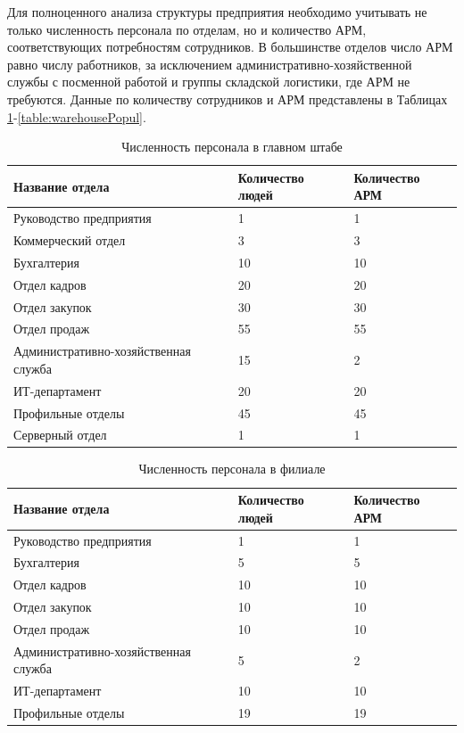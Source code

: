 \documentclass[14pt, a4paper]{extarticle}
\numberwithin{equation}{section}
\begin{document}
Для полноценного анализа структуры предприятия необходимо учитывать не 
только численность персонала по отделам, но и количество АРМ, 
соответствующих потребностям сотрудников. В большинстве отделов число 
АРМ равно числу работников, за исключением административно-хозяйственной 
службы с посменной работой и группы складской логистики, где АРМ не требуются. 
Данные по количеству сотрудников и АРМ представлены в Таблицах 
\ref{table:mainDepPopul}-\ref{table:warehousePopul}.

\begin{table}[H]
\centering
\small
\caption{Численность персонала в главном штабе}
\begin{tabular}{|m{5cm}|m{3cm}|m{3cm}|}
\hline
\textbf{Название отдела} & \textbf{Количество людей} & \textbf{Количество АРМ} \\
\hline
Руководство предприятия & 1 & 1 \\
\hline
Коммерческий отдел & 3 & 3 \\
\hline
Бухгалтерия & 10 & 10 \\
\hline
Отдел кадров & 20 & 20 \\
\hline
Отдел закупок & 30 & 30 \\
\hline
Отдел продаж & 55 & 55 \\
\hline
Административно-хозяйственная служба & 15 & 2 \\
\hline
ИТ-департамент & 20 & 20 \\
\hline
Профильные отделы & 45 & 45 \\
\hline
Серверный отдел & 1 & 1 \\
\hline
\end{tabular}
\label{table:mainDepPopul}
\end{table}


\begin{table}[H]
\centering
\small
\caption{Численность персонала в филиале}
\begin{tabular}{|m{5cm}|m{3cm}|m{3cm}|}
\hline
\textbf{Название отдела} & \textbf{Количество людей} & \textbf{Количество АРМ} \\
\hline
Руководство предприятия & 1 & 1 \\
\hline
Бухгалтерия & 5 & 5 \\
\hline
Отдел кадров & 10 & 10 \\
\hline
Отдел закупок & 10 & 10 \\
\hline
Отдел продаж & 10 & 10 \\
\hline
Административно-хозяйственная служба & 5 & 2 \\
\hline
ИТ-департамент & 10 & 10 \\
\hline
Профильные отделы & 19 & 19 \\
\hline
\end{tabular}
\label{table:filialPopul}
\end{table}
\end{document}
